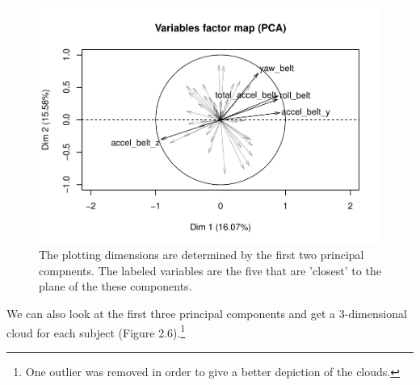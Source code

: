 \documentclass[12pt,twoside]{reedthesis}
\begin{document}
  \begin{figure}
  
  {\centering \includegraphics{A_Random_Forest_Model_for_Computer-Assisted_Activity-Recognition_files/figure-latex/unnamed-chunk-51-1} 
  
  }
  
  \caption[The plotting dimensions are determined by the first two principal compnents]{The plotting dimensions are determined by the first two principal compnents.  The labeled variables are the five that are 'closest' to the plane of the these components.}\label{fig:unnamed-chunk-51}
  \end{figure}
  
  \begin{Shaded}
  \begin{Highlighting}[]
  \end{Highlighting}
  \end{Shaded}
  
  \newpage
  
  We can also look at the first three principal components and get a
  3-dimensional cloud for each subject (Figure 2.6).\footnote{One outlier
    was removed in order to give a better depiction of the clouds.}
  
\end{document}
